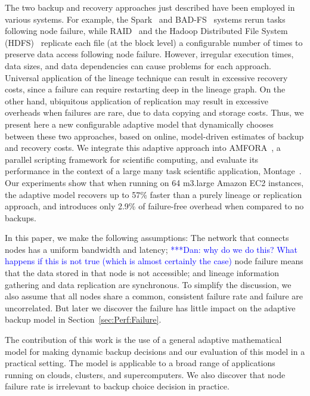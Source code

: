\documentclass{sig-alternate}
\newcommand{\katznote}[1]{ {\textcolor{blue}    { ***Dan:      #1 }}}
\newcommand{\zhaonote}[1]{{\textcolor{cyan}    { ***Zhao:      #1 }}}
\newcommand{\katznote}[1]{}
\newcommand{\zhaonote}[1]{}
\begin{document}
The two backup and recovery approaches just described have been employed in various systems. For example,
the Spark~\cite{RDD2012} and BAD-FS~\cite{badfs2004} systems rerun tasks following node failure,
while RAID~\cite{raid1988} and the Hadoop Distributed File System (HDFS)~\cite{HDFS} replicate each file (at the block level) a configurable number of times to preserve data access following node failure.
However, irregular execution times, data sizes, and data dependencies can cause problems for each approach. Universal application of the lineage technique can result in excessive recovery costs, since a failure can 
require restarting deep in the lineage graph.
On the other hand, ubiquitous application of replication may result in excessive overheads when failures are rare, due to data copying and storage costs.
Thus, we present here a new configurable adaptive model that dynamically chooses between these two approaches,
based on online, model-driven estimates of backup and recovery costs. We integrate this adaptive approach into
AMFORA~\cite{AMFS2013},
a parallel scripting framework for scientific computing, and evaluate its performance in the context of a large many task scientific application, Montage~\cite{montage2, montage1}. 
Our experiments show that when running on 64 m3.large Amazon EC2 instances, the adaptive model recovers up to 57\% faster than a purely lineage or replication approach, and introduces only 2.9\% of failure-free overhead when compared to no backups.



In this paper, we make the following assumptions: The network that connects nodes has a uniform bandwidth and latency;  \katznote{why do we do this?  What happens if this is not true (which is almost certainly the case)} node failure means that the data stored in that node is not accessible; and lineage information gathering and data replication are synchronous. To simplify the discussion, we also assume that all nodes share a common, consistent failure rate and failure are uncorrelated. But later we discover the failure has little impact on the adaptive backup model in Section~\ref{sec:Perf:Failure}. 


The contribution of this work is the use of a general adaptive mathematical model for making dynamic backup decisions and our evaluation of this model in a practical setting.
The model is applicable to a broad range of applications running on clouds, clusters, and supercomputers. We also discover that node failure rate is irrelevant to backup choice decision in practice.
\end{document}

